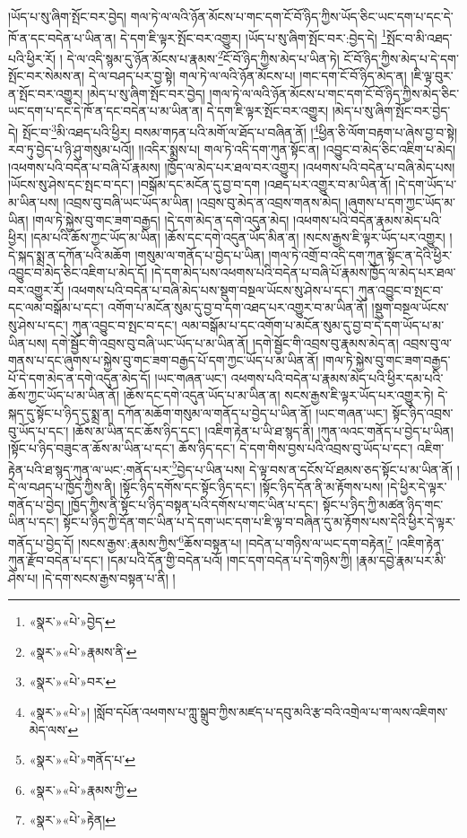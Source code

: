 །ཡོད་པ་སུ་ཞིག་སྤོང་བར་བྱེད། གལ་ཏེ་ལ་ལའི་ཉོན་མོངས་པ་གང་དག་ངོ་བོ་ཉིད་ཀྱིས་ཡོད་ཅིང་ཡང་དག་པ་དང་དེ་ཁོ་ན་དང་བདེན་པ་ཡིན་ན། དེ་དག་ཇི་ལྟར་སྤོང་བར་འགྱུར། །ཡོད་པ་སུ་ཞིག་སྤོང་བར་:བྱེད་དེ། \footnote{«སྣར་»«པེ་»བྱེད་}སྤོང་བ་མི་འཐད་པའི་ཕྱིར་རོ། །
དེ་ལ་འདི་སྙམ་དུ་ཉོན་མོངས་པ་རྣམས་\footnote{«སྣར་»«པེ་»རྣམས་ནི་}ངོ་བོ་ཉིད་ཀྱིས་མེད་པ་ཡིན་ཏེ། ངོ་བོ་ཉིད་ཀྱིས་མེད་པ་དེ་དག་སྤོང་བར་སེམས་ན། དེ་ལ་བཤད་པར་བྱ་སྟེ། གལ་ཏེ་ལ་ལའི་ཉོན་མོངས་པ། །གང་དག་ངོ་བོ་ཉིད་མེད་ན། །ཇི་ལྟ་བུར་ན་སྤོང་བར་འགྱུར། །མེད་པ་སུ་ཞིག་སྤོང་བར་བྱེད། །གལ་ཏེ་ལ་ལའི་ཉོན་མོངས་པ་གང་དག་ངོ་བོ་ཉིད་ཀྱིས་མེད་ཅིང་ཡང་དག་པ་དང་དེ་ཁོ་ན་དང་བདེན་པ་མ་ཡིན་ན། དེ་དག་ཇི་ལྟར་སྤོང་བར་འགྱུར། །མེད་པ་སུ་ཞིག་སྤོང་བར་བྱེད་དེ། སྤོང་བ་\footnote{«སྣར་»«པེ་»བར་}མི་འཐད་པའི་ཕྱིར། བསམ་གཏན་པའི་མགོ་ལ་ཐོད་པ་བཞིན་ནོ། །\footnote{«སྣར་»«པེ་»། །སློབ་དཔོན་འཕགས་པ་ཀླུ་སྒྲུབ་ཀྱིས་མཛད་པ་དབུ་མའི་རྩ་བའི་འགྲེལ་པ་ག་ལས་འཇིགས་མེད་ལས་}ཕྱིན་ཅི་ལོག་བརྟག་པ་ཞེས་བྱ་བ་སྟེ། རབ་ཏུ་བྱེད་པ་ཉི་ཤུ་གསུམ་པའོ།། །།འདིར་སྨྲས་པ། གལ་ཏེ་འདི་དག་ཀུན་སྟོང་ན། །འབྱུང་བ་མེད་ཅིང་འཇིག་པ་མེད། །འཕགས་པའི་བདེན་པ་བཞི་པོ་རྣམས། །ཁྱོད་ལ་མེད་པར་ཐལ་བར་འགྱུར། །འཕགས་པའི་བདེན་པ་བཞི་མེད་པས། །ཡོངས་སུ་ཤེས་དང་སྤང་བ་དང་། །བསྒོམ་དང་མངོན་དུ་བྱ་བ་དག །འཐད་པར་འགྱུར་བ་མ་ཡིན་ནོ། །དེ་དག་ཡོད་པ་མ་ཡིན་པས། །འབྲས་བུ་བཞི་ཡང་ཡོད་མ་ཡིན། །འབྲས་བུ་མེད་ན་འབྲས་གནས་མེད། །ཞུགས་པ་དག་ཀྱང་ཡོད་མ་ཡིན། །གལ་ཏེ་སྐྱེས་བུ་གང་ཟག་བརྒྱད། །དེ་དག་མེད་ན་དགེ་འདུན་མེད། །འཕགས་པའི་བདེན་རྣམས་མེད་པའི་ཕྱིར། །དམ་པའི་ཆོས་ཀྱང་ཡོད་མ་ཡིན། །ཆོས་དང་དགེ་འདུན་ཡོད་མིན་ན། །སངས་རྒྱས་ཇི་ལྟར་ཡོད་པར་འགྱུར། །དེ་སྐད་སྨྲ་ན་དཀོན་པའི་མཆོག །གསུམ་ལ་གནོད་པ་བྱེད་པ་ཡིན། །གལ་ཏེ་འགྲོ་བ་འདི་དག་ཀུན་སྟོང་ན་དེའི་ཕྱིར་འབྱུང་བ་མེད་ཅིང་འཇིག་པ་མེད་དོ། །དེ་དག་མེད་པས་འཕགས་པའི་བདེན་པ་བཞི་པོ་རྣམས་ཁྱོད་ལ་མེད་པར་ཐལ་བར་འགྱུར་རོ། །འཕགས་པའི་བདེན་པ་བཞི་མེད་པས་སྡུག་བསྔལ་ཡོངས་སུ་ཤེས་པ་དང་། ཀུན་འབྱུང་བ་སྤང་བ་དང་ལམ་བསྒོམ་པ་དང་། འགོག་པ་མངོན་སུམ་དུ་བྱ་བ་དག་འཐད་པར་འགྱུར་བ་མ་ཡིན་ནོ། །སྡུག་བསྔལ་ཡོངས་སུ་ཤེས་པ་དང་། ཀུན་འབྱུང་བ་སྤང་བ་དང་། ལམ་བསྒོམ་པ་དང་འགོག་པ་མངོན་སུམ་དུ་བྱ་བ་དེ་དག་ཡོད་པ་མ་ཡིན་པས། དགེ་སྦྱོང་གི་འབྲས་བུ་བཞི་ཡང་ཡོད་པ་མ་ཡིན་ནོ། །དགེ་སྦྱོང་གི་འབྲས་བུ་རྣམས་མེད་ན། འབྲས་བུ་ལ་གནས་པ་དང་ཞུགས་པ་སྐྱེས་བུ་གང་ཟག་བརྒྱད་པོ་དག་ཀྱང་ཡོད་པ་མ་ཡིན་ནོ། །གལ་ཏེ་སྐྱེས་བུ་གང་ཟག་བརྒྱད་པོ་དེ་དག་མེད་ན་དགེ་འདུན་མེད་དོ། །ཡང་གཞན་ཡང་། འཕགས་པའི་བདེན་པ་རྣམས་མེད་པའི་ཕྱིར་དམ་པའི་ཆོས་ཀྱང་ཡོད་པ་མ་ཡིན་ནོ། །ཆོས་དང་དགེ་འདུན་ཡོད་པ་མ་ཡིན་ན། སངས་རྒྱས་ཇི་ལྟར་ཡོད་པར་འགྱུར་ཏེ། དེ་སྐད་དུ་སྟོང་པ་ཉིད་དུ་སྨྲ་ན། དཀོན་མཆོག་གསུམ་ལ་གནོད་པ་བྱེད་པ་ཡིན་ནོ། །ཡང་གཞན་ཡང་། སྟོང་ཉིད་འབྲས་བུ་ཡོད་པ་དང་། །ཆོས་མ་ཡིན་དང་ཆོས་ཉིད་དང་། །འཇིག་རྟེན་པ་ཡི་ཐ་སྙད་ནི། །ཀུན་ལའང་གནོད་པ་བྱེད་པ་ཡིན། །སྟོང་པ་ཉིད་བཟུང་ན་ཆོས་མ་ཡིན་པ་དང་། ཆོས་ཉིད་དང་། དེ་དག་གིས་བྱས་པའི་འབྲས་བུ་ཡོད་པ་དང་། འཇིག་རྟེན་པའི་ཐ་སྙད་ཀུན་ལ་ཡང་:གནོད་པར་\footnote{«སྣར་»«པེ་»གནོད་པ་}བྱེད་པ་ཡིན་པས། དེ་ལྟ་བས་ན་དངོས་པོ་ཐམས་ཅད་སྟོང་པ་མ་ཡིན་ནོ། །དེ་ལ་བཤད་པ་ཁྱོད་ཀྱིས་ནི། །སྟོང་ཉིད་དགོས་དང་སྟོང་ཉིད་དང་། །སྟོང་ཉིད་དོན་ནི་མ་རྟོགས་པས། །དེ་ཕྱིར་དེ་ལྟར་གནོད་པ་བྱེད། །ཁྱོད་ཀྱིས་ནི་སྟོང་པ་ཉིད་བསྟན་པའི་དགོས་པ་གང་ཡིན་པ་དང་། སྟོང་པ་ཉིད་ཀྱི་མཚན་ཉིད་གང་ཡིན་པ་དང་། སྟོང་པ་ཉིད་ཀྱི་དོན་གང་ཡིན་པ་དེ་དག་ཡང་དག་པ་ཇི་ལྟ་བ་བཞིན་དུ་མ་རྟོགས་པས་དེའི་ཕྱིར་དེ་ལྟར་གནོད་པ་བྱེད་དོ། །སངས་རྒྱས་:རྣམས་ཀྱིས་\footnote{«སྣར་»«པེ་»རྣམས་ཀྱི་}ཆོས་བསྟན་པ། །བདེན་པ་གཉིས་ལ་ཡང་དག་བརྟེན།\footnote{«སྣར་»«པེ་»རྟེན།} །འཇིག་རྟེན་ཀུན་རྫོབ་བདེན་པ་དང་། །དམ་པའི་དོན་གྱི་བདེན་པའོ། །གང་དག་བདེན་པ་དེ་གཉིས་ཀྱི། །རྣམ་དབྱེ་རྣམ་པར་མི་ཤེས་པ། །དེ་དག་སངས་རྒྱས་བསྟན་པ་ནི། །
